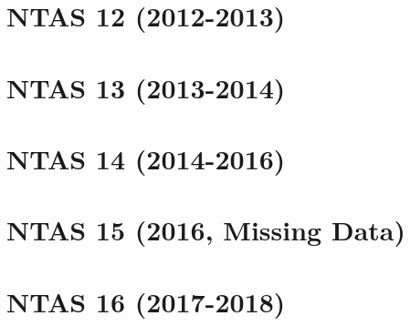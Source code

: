 \documentclass[12pt]{report}
\newcommand{\imagepath}{/Users/yugao/UOP/ORS-processing/img}
\begin{document}
\providecommand{\projectname}{}
\providecommand{\displayprojectname}{}
\providecommand{\caseyear}{}
\providecommand{\casenumber}{}
\providecommand{\previouscasenumber}{}
\providecommand{\imagepath}{}
\providecommand{\HasNextDeploymentOverlap}{}
\providecommand{\FirstInstrumentType}{}
\providecommand{\SecondInstrumentType}{}
\providecommand{\DeploymentSpike}{}
\providecommand{\DeploymentRecordedSpike}{}
\providecommand{\DeploymentStart}{}
\providecommand{\RecoverySpike}{}
\providecommand{\RecoveryRecordedSpike}{}
\providecommand{\DeploymentEnd}{}
\providecommand{\FirstInstrument}{}
\providecommand{\SecondInstrument}{}
\providecommand{\PreviousDeploymentInstrument}{}
\providecommand{\CurrentDeploymentInstrument}{}
\providecommand{\pressureavailable}{}
\providecommand{\pressurenote}{}
\providecommand{\MeanDiffTemp}{}
\providecommand{\StdDiffTemp}{}
\providecommand{\StdSingleTemp}{}
\providecommand{\MeanDiffCond}{}
\providecommand{\StdDiffCond}{}
\providecommand{\StdSingleCond}{}
\providecommand{\MeanDiffPSal}{}
\providecommand{\StdDiffPSal}{}
\providecommand{\StdSinglePSal}{}
\providecommand{\MeanDiffASal}{}
\providecommand{\StdDiffASal}{}
\providecommand{\StdSingleASal}{}
\providecommand{\MeanDiffPres}{}
\providecommand{\StdDiffPres}{}
\providecommand{\StdSinglePres}{}
\providecommand{\WindowSize}{}
\providecommand{\ThresholdValue}{}

\chapter{NTAS 12 (2012-2013)}



\chapter{NTAS 13 (2013-2014)}



\chapter{NTAS 14 (2014-2016)}



\chapter{NTAS 15 (2016, Missing Data)}



\chapter{NTAS 16 (2017-2018)}


\end{document}
